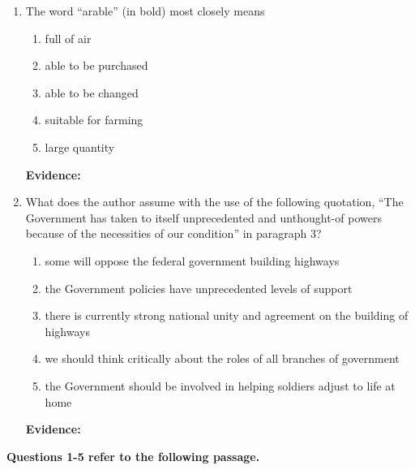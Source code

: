 \begin{enumerate}
\bigskip
\item The word ``arable'' (in bold) most closely means

\begin{enumerate}[label=(\Alph*)]
\item full of air
\item able to be purchased
\item able to be changed
\item suitable for farming
\item large quantity
\end{enumerate}

\bigskip
\textbf{Evidence:} \hrulefill


\bigskip
\item What does the author assume with the use of the following quotation, ``The Government has taken to itself unprecedented and unthought-of powers because of the necessities of our condition'' in paragraph 3?

\begin{enumerate}[label=(\Alph*)]
\item some will oppose the federal government building highways
\item the Government policies have unprecedented levels of support
\item there is currently strong national unity and agreement on the building of highways
\item we should think critically about the roles of all branches of government
\item the Government should be involved in helping soldiers adjust to life at home
\end{enumerate}

\bigskip
\textbf{Evidence:} \hrulefill

\end{enumerate}

\bigskip
\textbf{Questions 1-5 refer to the following passage.}

